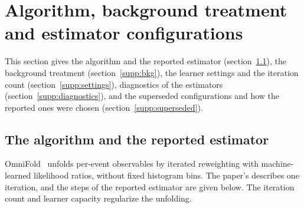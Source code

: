 \section{Algorithm, background treatment and estimator configurations}
\label{supp:estimators}
This section gives the algorithm and the reported estimator (section~\ref{supp:algo}), the background treatment (section~\ref{supp:bkg}), the learner settings and the iteration count (section~\ref{supp:settings}), diagnostics of the estimators (section~\ref{supp:diagnostics}), and the superseded configurations and how the reported ones were chosen (section~\ref{supp:superseded}).

\subsection{The algorithm and the reported estimator}
\label{supp:algo}

\label{sec:method-algo}
OmniFold~\cite{Andreassen:2019cjw,Andreassen:2021zzk} unfolds per-event observables by iterated reweighting with machine-learned likelihood ratios, without fixed histogram bins. The paper's  describes one iteration, and the steps of the reported estimator are given below. The iteration count and learner capacity regularize the unfolding.

